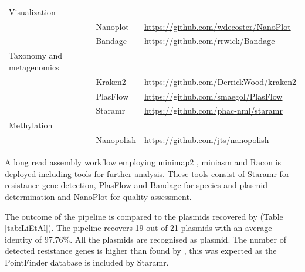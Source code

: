 \documentclass[a4paper,num-refs]{oup-contemporary}
\begin{document}
\begin{table}[b!]
\begin{tabularx}{\linewidth}{l l l}
Visualization                   &            &                                               \\
                                & Nanoplot   & \url{https://github.com/wdecoster/NanoPlot}   \\
                                & Bandage    & \url{https://github.com/rrwick/Bandage}       \\
Taxonomy and metagenomics       &            &                                               \\
                                & Kraken2    & \url{https://github.com/DerrickWood/kraken2}  \\
                                & PlasFlow   & \url{https://github.com/smaegol/PlasFlow}     \\
                                & Staramr    & \url{https://github.com/phac-nml/staramr}     \\
Methylation                     &            &                                               \\
                                & Nanopolish & \url{https://github.com/jts/nanopolish}       \\
\bottomrule
\end{tabularx}
\end{table}

A long read assembly workflow employing minimap2 \cite{Li2018a}, miniasm \cite{Li2016} and Racon \cite{Vaser2017} is deployed including tools for further analysis. These tools consist of Staramr \cite{} for resistance gene detection, PlasFlow \cite{Krawczyk2018} and Bandage \cite{Wick2015} for species and plasmid determination and NanoPlot \cite{DeCoster2018} for quality assessment.

The outcome of the pipeline is compared to the plasmids recovered by \citet{Li2018} (Table \ref{tab:LiEtAl}). The pipeline recovers 19 out of 21 plasmids with an average identity of 97.76\%. All the plasmids are recognised as plasmid. The number of detected resistance genes is higher than found by \citet{Li2018}, this was expected as the PointFinder database is included by Staramr.
\end{document}
